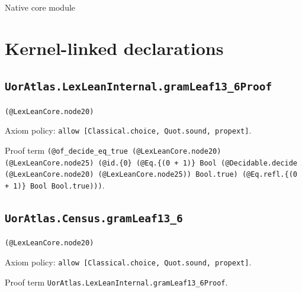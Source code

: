 \documentclass[11pt]{article}
\begin{document}
\begin{center}{\LARGE Native core module}\end{center}
\section*{Kernel-linked declarations}
\subsection*{\texttt{UorAtlas.LexLeanInternal.gramLeaf13\_6Proof}}
\noindent\texttt{(@LexLeanCore.node20)}\par
\noindent Axiom policy: \texttt{allow [Classical.choice, Quot.sound, propext]}.\par
\noindent Proof term \texttt{(@of\_decide\_eq\_true (@LexLeanCore.node20) (@LexLeanCore.node25) (@id.\{0\} (@Eq.\{(0 + 1)\} Bool (@Decidable.decide (@LexLeanCore.node20) (@LexLeanCore.node25)) Bool.true) (@Eq.refl.\{(0 + 1)\} Bool Bool.true)))}.\par
\subsection*{\texttt{UorAtlas.Census.gramLeaf13\_6}}
\noindent\texttt{(@LexLeanCore.node20)}\par
\noindent Axiom policy: \texttt{allow [Classical.choice, Quot.sound, propext]}.\par
\noindent Proof term \texttt{UorAtlas.LexLeanInternal.gramLeaf13\_6Proof}.\par
\end{document}
